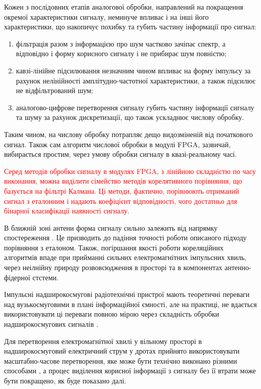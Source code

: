 Кожен з послідовних етапів аналогової обробки, направлений на покращення 
окремої характеристики сигналу, неминуче впливає і на інші його характеристики,
що накопичує похибку та губить частину інформації про сигнал:

\begin{enumerate}
	\item фільтрація разом з інформацією про шум частково зачіпає спектр, 
	а відповідно і форму корисного сигналу і не прибирає шум повністю;
	\item кавзі-лінійне підсилювання незначним чином впливає на 
	форму імпульсу за рахунок нелінійності амплітудно-частотної 
	характеристики, а також підсилює не відфільтрований шум;
	\item аналогово-цифрове перетворення сигналу губить частину інформації 
	сигналу та шуму за рахунок дискретизації, що також ускладнює числову 
	обробку.
\end{enumerate}

Таким чином, на числову обробку потрапляє дещо видозміненій від початкового
сигнал. Також сам алгоритм числової обробки в модулі FPGA, зазвичай,
вибирається простим, через умову обробки сигналу в квазі-реальному часі.

\textcolor{red}{
Серед методів обробки сигналу в модулях FPGA, з лінійною складністю по часу 
виконання, можна виділити сімейство методів корелятивного порівняння, що 
базується на фільтрі Калмана. Ці методи, фактично, порівнюють отриманий сигнал 
з еталонним і надають коефіцієнт відповідності, чого достатньо для бінарної
класифікації наявності сигналу. }

В ближній зоні антени форма сигналу сильно залежить від напрямку 
спостереження \cite{imp:Wu1985, imp:Sodin1992-10, my:Telecom2018}. Це 
призводить до падіння точності роботи описаного підходу порівняння з 
еталоном. Також, погіршання якості роботи кореляційних алгоритмів впаде 
при прийманні сильних електромагнітних імпульсних хвиль, через неілнійну 
природу розвовсюдження в просторі та в компонентах антенно-фідерної стстеми.

Імпульсні надширокосмугові радіотехнічні пристрої мають теоретичні переваги 
над вузькосмуговими в плані інформаційної ємності, але на практиці, не 
вдається використовувати ці переваги повною мірою через складність обробки 
надширокосмугових сигналів \cite{imp:ChannelLimitations}. 

Для перетворення електромагнітної хвилі у вільному просторі в надширокосмуговий 
електричний струм у дротах прийнято використовувати масштабно-часове 
перетворення, яке може бути технічно виконано різними способами 
\cite{imp:Astanin1989}, а процес виділення корисної інформації з сигналу без 
її втрати може бути покращено, як буде показано далі.


